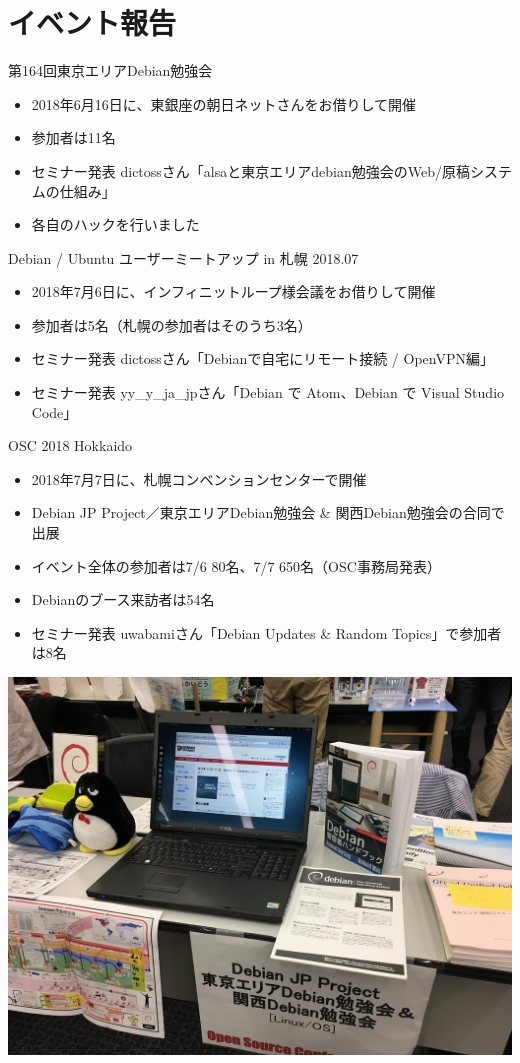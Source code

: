 \section{イベント報告}

\begin{frame}{第164回東京エリアDebian勉強会}
\begin{itemize}
\item 2018年6月16日に、東銀座の朝日ネットさんをお借りして開催
\item 参加者は11名
\item セミナー発表 dictossさん「alsaと東京エリアdebian勉強会のWeb/原稿システムの仕組み」
\item 各自のハックを行いました
\end{itemize} 
\end{frame}

\begin{frame}{Debian / Ubuntu ユーザーミートアップ in 札幌 2018.07}
\begin{itemize}
\item 2018年7月6日に、インフィニットループ様会議をお借りして開催
\item 参加者は5名（札幌の参加者はそのうち3名）
\item セミナー発表 dictossさん「Debianで自宅にリモート接続 / OpenVPN編」
\item セミナー発表 yy\_y\_ja\_jpさん「Debian で Atom、Debian で Visual Studio Code」
\end{itemize} 
\end{frame}

\begin{frame}{OSC 2018 Hokkaido}
\begin{itemize}
\item 2018年7月7日に、札幌コンベンションセンターで開催
\item Debian JP Project／東京エリアDebian勉強会 \& 関西Debian勉強会の合同で出展
\item イベント全体の参加者は7/6 80名、7/7 650名（OSC事務局発表）
\item Debianのブース来訪者は54名
\item セミナー発表 uwabamiさん「Debian Updates \& Random Topics」で参加者は8名
\end{itemize}

\begin{center}
  \includegraphics[width=0.3\hsize]{image201808/osc2018do_booth.jpg}
\end{center}
\end{frame}



